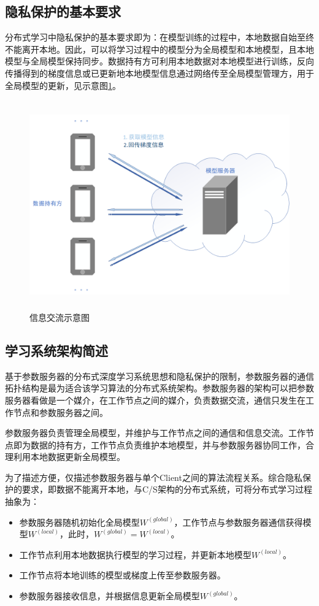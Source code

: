 \documentclass[zihao = -4,cn]{oucart}
\begin{document}
\subsection{隐私保护的基本要求}
分布式学习中隐私保护的基本要求即为：在模型训练的过程中，本地数据自始至终不能离开本地。因此，可以将学习过程中的模型分为全局模型和本地模型，且本地模型与全局模型保持同步。数据持有方可利用本地数据对本地模型进行训练，反向传播得到的梯度信息或已更新地本地模型信息通过网络传至全局模型管理方，用于全局模型的更新，见示意图\ref{fig:commu}。
\begin{figure}[h]
\centering %
\includegraphics[width=15cm,height=9cm]{assets/test}
\caption{信息交流示意图}
\label{fig:commu}
\end{figure}

\subsection{学习系统架构简述}
基于参数服务器的分布式深度学习系统思想和隐私保护的限制，参数服务器的通信拓扑结构是最为适合该学习算法的分布式系统架构。参数服务器的架构可以把参数服务器看做是一个媒介，在工作节点之间的媒介，负责数据交流，通信只发生在工作节点和参数服务器之间。\par
参数服务器负责管理全局模型，并维护与工作节点之间的通信和信息交流。工作节点即为数据的持有方，工作节点负责维护本地模型，并与参数服务器协同工作，合理利用本地数据更新全局模型。\par
为了描述方便，仅描述参数服务器与单个Client之间的算法流程关系。综合隐私保护的要求，即数据不能离开本地，与C/S架构的分布式系统，可将分布式学习过程抽象为：
\begin{itemize}
	\item [1)]
	参数服务器随机初始化全局模型$W^{(global)}$，工作节点与参数服务器通信获得模型$W^{(local)}$，此时，$W^{(global)} = W^{(local)}$。
	\item [2)]
	工作节点利用本地数据执行模型的学习过程，并更新本地模型$W^{(local)}$。
	\item [3)]
	工作节点将本地训练的模型或梯度上传至参数服务器。
	\item [4)]
	参数服务器接收信息，并根据信息更新全局模型$W^{(global)}$。\par
\end{itemize}
\end{document}
